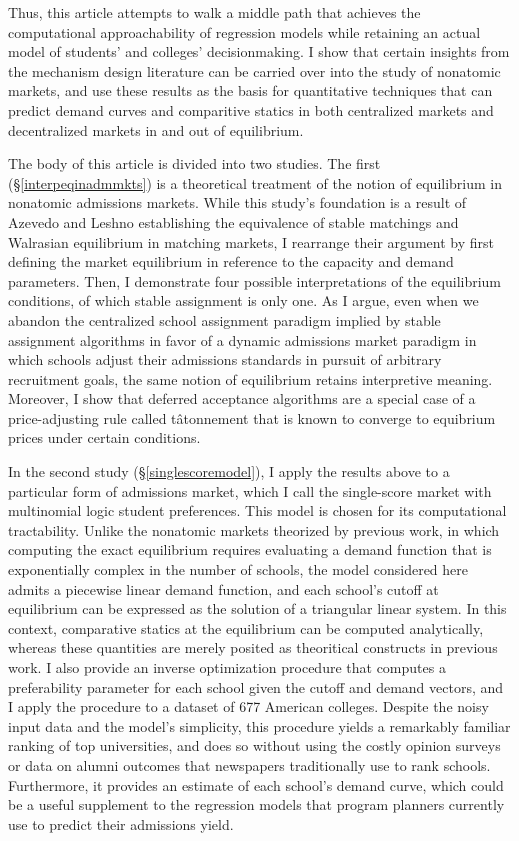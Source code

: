 \documentclass[12pt]{article}
\theoremstyle{definition}
\begin{document}
Thus, this article attempts to walk a middle path that achieves the computational approachability of regression models while retaining an actual model of students' and colleges' decisionmaking. I show that certain insights from the mechanism design literature can be carried over into the study of nonatomic markets, and use these results as the basis for quantitative techniques that can predict demand curves and comparitive statics in both centralized markets and decentralized markets in and out of equilibrium.

The body of this article is divided into two studies. The first (\S\ref{interpeqinadmmkts}) is a theoretical treatment of the notion of equilibrium in nonatomic admissions markets. While this study's foundation is a result of Azevedo and Leshno \parencite*{supplydemandfw} establishing the equivalence of stable matchings and Walrasian equilibrium in matching markets, I rearrange their argument by first defining the market equilibrium in reference to the capacity and demand parameters. Then, I demonstrate four possible interpretations of the equilibrium conditions, of which stable assignment is only one. As I argue, even when we abandon the centralized school assignment paradigm implied by stable assignment algorithms in favor of a dynamic admissions market paradigm in which schools adjust their admissions standards in pursuit of arbitrary recruitment goals, the same notion of equilibrium retains interpretive meaning. Moreover, I show that deferred acceptance algorithms are a special case of a price-adjusting rule called t\^{a}tonnement that is known to converge to equibrium prices under certain conditions.

In the second study (\S\ref{singlescoremodel}), I apply the results above to a particular form of admissions market, which I call the single-score market with multinomial logic student preferences. This model is chosen for its computational tractability. Unlike the nonatomic markets theorized by previous work, in which computing the exact equilibrium requires evaluating a demand function that is exponentially complex in the number of schools, the model considered here admits a piecewise linear demand function, and each school's cutoff at equilibrium can be expressed as the solution of a triangular linear system. In this context, comparative statics at the equilibrium can be computed analytically, whereas these quantities are merely posited as theoritical constructs in previous work. I also provide an inverse optimization procedure that computes a preferability parameter for each school given the cutoff and demand vectors, and I apply the procedure to a dataset of 677 American colleges. Despite the noisy input data and the model's simplicity, this procedure yields a remarkably familiar ranking of top universities, and does so without using the costly opinion surveys or data on alumni outcomes that newspapers traditionally use to rank schools. Furthermore, it provides an estimate of each school's demand curve, which could be a useful supplement to the regression models that program planners currently use to predict their admissions yield.
\end{document}
